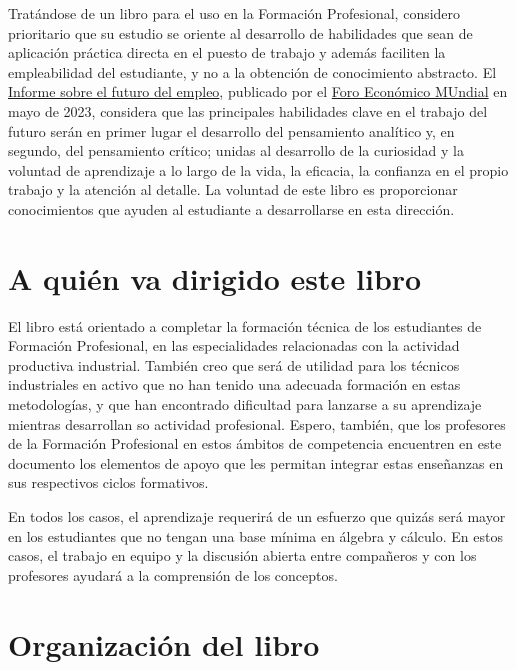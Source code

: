 \documentclass[
  letterpaper,
  DIV=11,
  numbers=noendperiod,
  oneside]{scrreprt}
\begin{document}
Tratándose de un libro para el uso en la Formación Profesional,
considero prioritario que su estudio se oriente al desarrollo de
habilidades que sean de aplicación práctica directa en el puesto de
trabajo y además faciliten la empleabilidad del estudiante, y no a la
obtención de conocimiento abstracto. El
\href{https://www.weforum.org/publications/the-future-of-jobs-report-2023}{Informe
sobre el futuro del empleo}, publicado por el
\href{https://www.weforum.org/}{Foro Económico MUndial} en mayo de 2023,
considera que las principales habilidades clave en el trabajo del futuro
serán en primer lugar el desarrollo del pensamiento analítico y, en
segundo, del pensamiento crítico; unidas al desarrollo de la curiosidad
y la voluntad de aprendizaje a lo largo de la vida, la eficacia, la
confianza en el propio trabajo y la atención al detalle. La voluntad de
este libro es proporcionar conocimientos que ayuden al estudiante a
desarrollarse en esta dirección.

\hypertarget{a-quiuxe9n-va-dirigido-este-libro}{%
\section*{A quién va dirigido este
libro}\label{a-quiuxe9n-va-dirigido-este-libro}}


El libro está orientado a completar la formación técnica de los
estudiantes de Formación Profesional, en las especialidades relacionadas
con la actividad productiva industrial. También creo que será de
utilidad para los técnicos industriales en activo que no han tenido una
adecuada formación en estas metodologías, y que han encontrado
dificultad para lanzarse a su aprendizaje mientras desarrollan so
actividad profesional. Espero, también, que los profesores de la
Formación Profesional en estos ámbitos de competencia encuentren en este
documento los elementos de apoyo que les permitan integrar estas
enseñanzas en sus respectivos ciclos formativos.

En todos los casos, el aprendizaje requerirá de un esfuerzo que quizás
será mayor en los estudiantes que no tengan una base mínima en álgebra y
cálculo. En estos casos, el trabajo en equipo y la discusión abierta
entre compañeros y con los profesores ayudará a la comprensión de los
conceptos.

\hypertarget{organizaciuxf3n-del-libro}{%
\section*{Organización del libro}\label{organizaciuxf3n-del-libro}}
\end{document}
